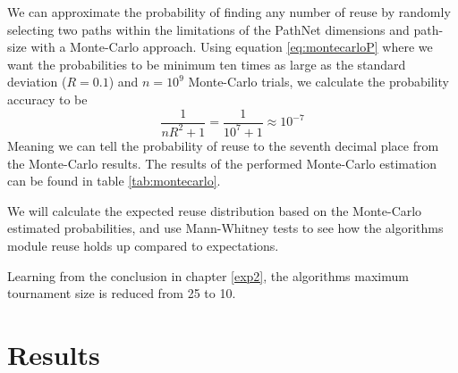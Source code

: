 

We can approximate the probability of finding any number of reuse by randomly selecting two paths within the limitations of the PathNet dimensions and path-size with a Monte-Carlo approach. Using equation \ref{eq:montecarloP} where we want the probabilities to be minimum ten times as large as the standard deviation (\(R=0.1\)) and \(n=10^{9}\) Monte-Carlo trials, we calculate the probability accuracy to be 
\begin{equation*}
    \frac{1}{nR^{2}+1}=\frac{1}{10^{7}+1}\approx10^{-7}
\end{equation*}
Meaning we can tell the probability of reuse to the seventh decimal place from the Monte-Carlo results. The results of the performed Monte-Carlo estimation can be found in table \ref{tab:montecarlo}.

We will calculate the expected reuse distribution based on the Monte-Carlo estimated probabilities, and use Mann-Whitney tests to see how the algorithms module reuse holds up compared to expectations. 

Learning from the conclusion in chapter \ref{exp2}, the algorithms maximum tournament size is reduced from 25 to 10.

\section{Results}

